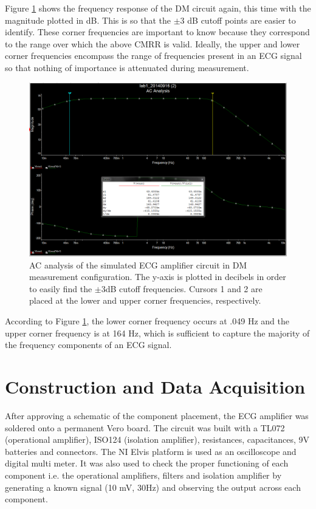 \documentclass[pdftex,12pt,letterpaper]{article}
\begin{document}
Figure \ref{fig:3DB} shows the frequency response of the DM circuit again, this time with the magnitude plotted in dB. This is so that the $\pm$3 dB cutoff points are easier to identify. These corner frequencies are important to know because they correspond to the range over which the above CMRR is valid. Ideally, the upper and lower corner frequencies encompass the range of frequencies present in an ECG signal so that nothing of importance is attenuated during measurement.
\begin{figure}[H]
\begin{center}
\includegraphics[scale=.35]{3db_analysis.png}
\caption{AC analysis of the simulated ECG amplifier circuit in DM measurement configuration. The y-axis is plotted in decibels in order to easily find the $\pm$3dB cutoff frequencies. Cursors 1  and 2 are placed at the lower and upper corner frequencies, respectively.}
\label{fig:3DB}
\end{center}
\end{figure}
According to Figure \ref{fig:3DB}, the lower corner frequency occurs at .049 Hz and the upper corner frequency is at 164 Hz, which is sufficient to capture the majority of the frequency components of an ECG signal.

\section{Construction and Data Acquisition}

After approving a schematic of the component placement, the ECG amplifier was soldered onto a permanent Vero board. The circuit was built with a TL072 (operational amplifier), ISO124 (isolation amplifier), resistances, capacitances, 9V batteries and connectors. The NI Elvis platform is used as an oscilloscope and digital multi meter. It was also used to check the proper functioning of each component i.e. the operational amplifiers, filters and isolation amplifier by generating a known signal (10 mV, 30Hz) and observing the output across each component. 
\end{document}
